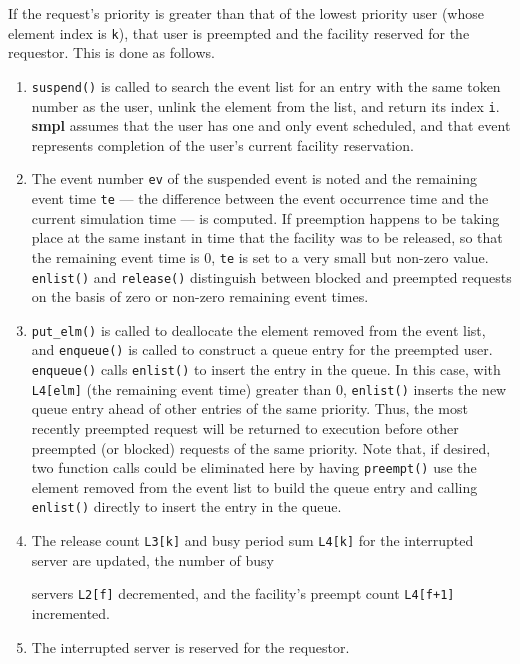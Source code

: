 If the request's priority is greater than that of the lowest priority user
(whose element index is \texttt{k}), that user is preempted and the facility reserved
for the requestor. This is done as follows.
\begin{enumerate}
\item \texttt{suspend()} is called to search the event list for an entry
with the same token number as the user, unlink the element
from the list, and return its index \texttt{i}. \textbf{smpl} assumes that the
user has one and only event scheduled, and that event represents
completion of the user's current facility reservation.
\item The event number \texttt{ev} of the suspended event is noted and
the remaining event time \texttt{te} --- the difference between the
event occurrence time and the current simulation time --- is
computed. If preemption happens to be taking place at the
same instant in time that the facility was to be released, so
that the remaining event time is 0, \texttt{te} is set to a very small
but non-zero value. \texttt{enlist()} and \texttt{release()} distinguish
between blocked and preempted requests on the basis of zero
or non-zero remaining event times.
\item \texttt{put\_elm()} is called to deallocate the element removed
from the event list, and \texttt{enqueue()} is called to construct a
queue entry for the preempted user. \texttt{enqueue()} calls
\texttt{enlist()} to insert the entry in the queue. In this case, with
\texttt{L4[elm]} (the remaining event time) greater than 0,
\texttt{enlist()} inserts the new queue entry ahead of other entries
of the same priority. Thus, the most recently preempted
request will be returned to execution before other preempted
(or blocked) requests of the same priority. Note that, if
desired, two function calls could be eliminated here by
having \texttt{preempt()} use the element removed from the event
list to build the queue entry and calling \texttt{enlist()} directly
to insert the entry in the queue.
\item The release count \texttt{L3[k]} and busy period sum \texttt{L4[k]} for
the interrupted server are updated, the number of busy

servers \texttt{L2[f]} decremented, and the facility's preempt count
\texttt{L4[f+1]} incremented.
\item The interrupted server is reserved for the requestor.
\end{enumerate}

